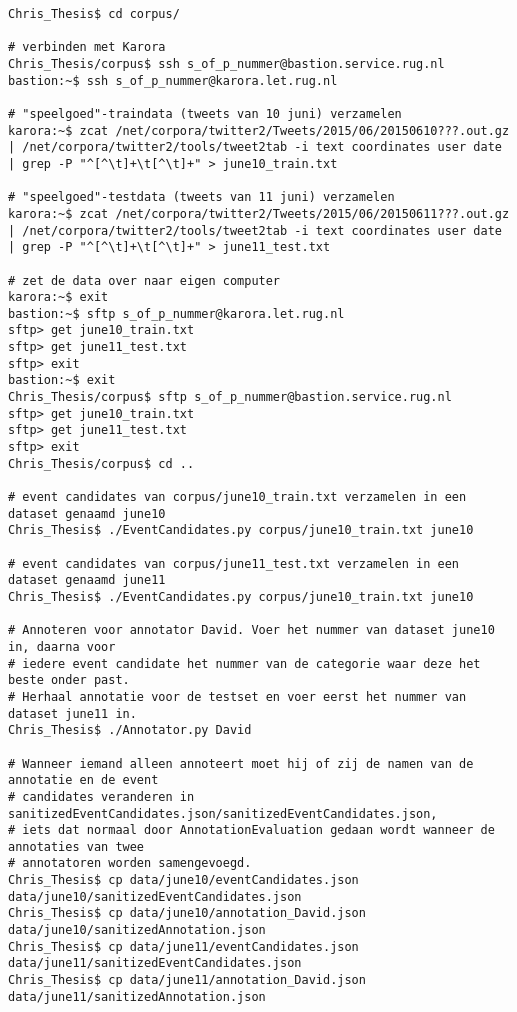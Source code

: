 {{\begin{lstlisting}
Chris_Thesis$ cd corpus/

# verbinden met Karora
Chris_Thesis/corpus$ ssh s_of_p_nummer@bastion.service.rug.nl
bastion:~$ ssh s_of_p_nummer@karora.let.rug.nl

# "speelgoed"-traindata (tweets van 10 juni) verzamelen
karora:~$ zcat /net/corpora/twitter2/Tweets/2015/06/20150610???.out.gz | /net/corpora/twitter2/tools/tweet2tab -i text coordinates user date | grep -P "^[^\t]+\t[^\t]+" > june10_train.txt

# "speelgoed"-testdata (tweets van 11 juni) verzamelen
karora:~$ zcat /net/corpora/twitter2/Tweets/2015/06/20150611???.out.gz | /net/corpora/twitter2/tools/tweet2tab -i text coordinates user date | grep -P "^[^\t]+\t[^\t]+" > june11_test.txt

# zet de data over naar eigen computer
karora:~$ exit
bastion:~$ sftp s_of_p_nummer@karora.let.rug.nl
sftp> get june10_train.txt 
sftp> get june11_test.txt
sftp> exit
bastion:~$ exit
Chris_Thesis/corpus$ sftp s_of_p_nummer@bastion.service.rug.nl
sftp> get june10_train.txt 
sftp> get june11_test.txt
sftp> exit
Chris_Thesis/corpus$ cd ..

# event candidates van corpus/june10_train.txt verzamelen in een dataset genaamd june10
Chris_Thesis$ ./EventCandidates.py corpus/june10_train.txt june10

# event candidates van corpus/june11_test.txt verzamelen in een dataset genaamd june11
Chris_Thesis$ ./EventCandidates.py corpus/june10_train.txt june10

# Annoteren voor annotator David. Voer het nummer van dataset june10 in, daarna voor 
# iedere event candidate het nummer van de categorie waar deze het beste onder past.
# Herhaal annotatie voor de testset en voer eerst het nummer van dataset june11 in.
Chris_Thesis$ ./Annotator.py David

# Wanneer iemand alleen annoteert moet hij of zij de namen van de annotatie en de event
# candidates veranderen in sanitizedEventCandidates.json/sanitizedEventCandidates.json, 
# iets dat normaal door AnnotationEvaluation gedaan wordt wanneer de annotaties van twee
# annotatoren worden samengevoegd.
Chris_Thesis$ cp data/june10/eventCandidates.json data/june10/sanitizedEventCandidates.json
Chris_Thesis$ cp data/june10/annotation_David.json data/june10/sanitizedAnnotation.json
Chris_Thesis$ cp data/june11/eventCandidates.json data/june11/sanitizedEventCandidates.json
Chris_Thesis$ cp data/june11/annotation_David.json data/june11/sanitizedAnnotation.json


\end{lstlisting}}}
